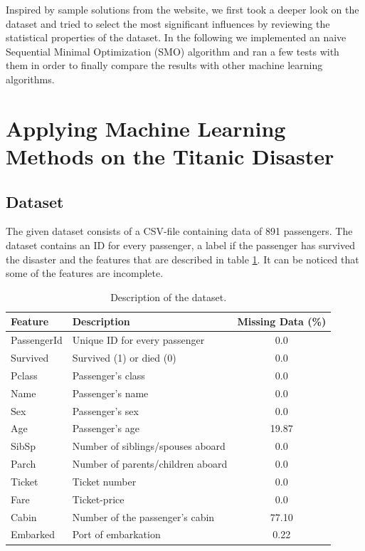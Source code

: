 Inspired by sample solutions from the website, we first took a deeper look on the dataset and tried to select the most significant influences by reviewing the statistical properties of the dataset. In the following we implemented an naive Sequential Minimal Optimization (SMO) algorithm and ran a few tests with them in order to finally compare the results with other machine learning algorithms.

\section{Applying Machine Learning Methods on the Titanic Disaster}
\subsection{Dataset}
The given dataset consists of a CSV-file containing data of 891 passengers. The dataset contains an ID for every passenger, a label if the passenger has survived the disaster and the features that are described in table \ref{tab:features}. It can be noticed that some of the features are incomplete.

\begin{table}
\begin{tabular}{|l|l|c|}
\hline
Feature & Description & Missing Data (\%) \\ \hline
PassengerId & Unique ID for every passenger & 0.0 \\ \hline
Survived & Survived (1) or died (0) & 0.0 \\ \hline
Pclass & Passenger's class & 0.0 \\ \hline
Name & Passenger's name & 0.0 \\ \hline
Sex & Passenger's sex & 0.0 \\ \hline
Age & Passenger's age & 19.87 \\ \hline
SibSp & Number of siblings/spouses aboard & 0.0 \\ \hline
Parch & Number of parents/children aboard & 0.0 \\ \hline
Ticket & Ticket number & 0.0 \\ \hline
Fare & Ticket-price & 0.0 \\ \hline
Cabin & Number of the passenger's cabin & 77.10 \\ \hline
Embarked & Port of embarkation & 0.22\\ \hline
\end{tabular}
\centering
\label{tab:features}
\caption{Description of the dataset.}
\end{table}

